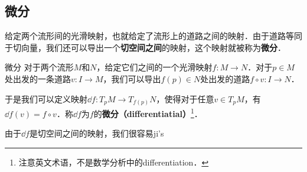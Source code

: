 


\subsection{微分}

给定两个流形间的光滑映射，也就给定了流形上的道路之间的映射．由于道路等同于切向量，我们还可以导出一个\textbf{切空间之间}的映射，这个映射就被称为\textbf{微分}．

\begin{definition}{微分}
对于两个流形$M$和$N$，给定它们之间的一个光滑映射$f:M\to N$．对于$p\in M$处出发的一条道路$v:I\to M$，我们可以导出$f(p)\in N$处出发的道路$f\circ v:I\to N$．

于是我们可以定义映射$\dd f: T_pM\to T_{f(p)}N$，使得对于任意$v\in T_pM$，有$\dd f(v)=f\circ v$．称$\dd f$为$f$的\textbf{微分（differentiatial）}\footnote{注意英文术语，不是数学分析中的differentiation．}．
\end{definition}

由于$\dd f$是切空间之间的映射，我们很容易ji's















